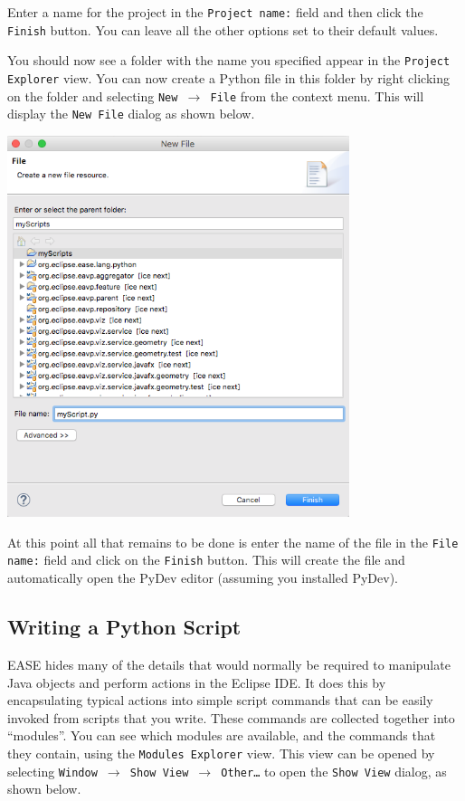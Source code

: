 \documentclass{article}
\begin{document}
Enter a name for the project in the \texttt{Project name:} field and then click the
\texttt{Finish} button. You can leave all the other options set to their default
values.

You should now see a folder with the name you specified appear in the
\texttt{Project Explorer} view. You can now create a Python file in this folder by
right clicking on the folder and selecting \texttt{New $\rightarrow$ File} from
the context menu. This will display the \texttt{New File} dialog as shown below.

\begin{center}
\includegraphics[width=10cm]{images/newfile}
\end{center}

At this point all that remains to be done is enter the name of the file in the
\texttt{File name:} field and click on the \texttt{Finish} button. This will
create the file and automatically open the PyDev editor (assuming you installed
PyDev).

\subsection{Writing a Python Script}

EASE hides many of the details that would normally be required to manipulate
Java objects and perform actions in the Eclipse IDE. It does this by
encapsulating typical actions into simple script commands that can be easily
invoked from scripts that you write. These commands are collected together into
``modules''. You can see which modules are available, and the commands that they
contain, using the \texttt{Modules Explorer} view. This view can be opened by
selecting \texttt{Window $\rightarrow$ Show View $\rightarrow$ Other\ldots} to
open the \texttt{Show View} dialog, as shown below.
\end{document}
